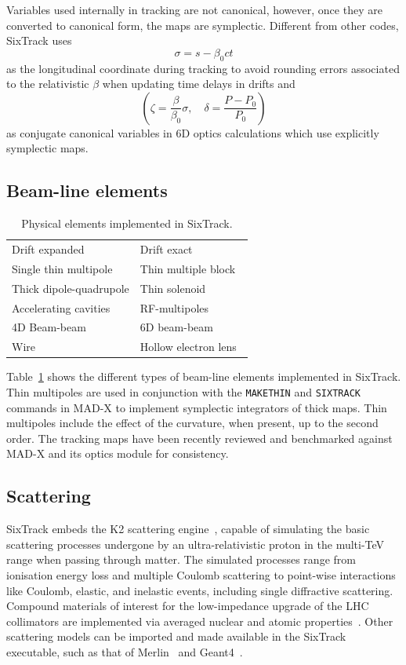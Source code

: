 \documentclass[a4paper,
              ]{jacow}
\begin{document}
Variables used internally in tracking are not canonical, however, once they are converted to canonical form, the maps are symplectic.
Different from other codes, SixTrack uses
\[
\sigma=s - \beta_0 c t
\]
as the longitudinal coordinate during tracking to avoid rounding errors associated to the relativistic $\beta$ when updating time delays in drifts and
\[
\left(\zeta=\frac{\beta}{\beta_0} \sigma, \quad \delta=\frac{P-P_0}{P_0}\right)
\]
as conjugate canonical variables in 6D optics calculations which use explicitly symplectic maps.


\subsection{Beam-line elements}

\begin{table}[ht]
    \centering
    \begin{tabular}{l|l}
        \hline
         Drift expanded & Drift exact~\cite{fjellstrom13} \\
         Single thin multipole &  Thin multiple block \\
         Thick dipole-quadrupole & Thin solenoid \\
         Accelerating cavities &  RF-multipoles~\cite{rf_multipoles}\\
         4D Beam-beam & 6D beam-beam~\cite{beam_beam}\\
         Wire~\cite{wire3} & Hollow electron lens~\cite{elens,elens3}\\
         \hline
    \end{tabular}
    \caption{Physical elements implemented in SixTrack.}
    \label{tab:tracking_elements}
\end{table}

Table~\ref{tab:tracking_elements} shows the different types of beam-line elements implemented in SixTrack. Thin multipoles are used in conjunction with the \texttt{MAKETHIN} and \texttt{SIXTRACK}  commands in MAD-X to implement symplectic integrators of thick maps.
Thin multipoles include the effect of the curvature, when present, up to the second order. The tracking maps have been recently reviewed and benchmarked against MAD-X and its optics module for consistency.

\subsection{Scattering}
SixTrack embeds the K2 scattering engine~\cite{K2,CTambascoThesis}, capable of simulating the basic scattering processes undergone by an ultra-relativistic proton in the multi-TeV range when passing through matter. The simulated processes range from ionisation energy loss and multiple Coulomb scattering to point-wise interactions like Coulomb, elastic, and inelastic events, including single diffractive scattering. Compound materials of interest for the low-impedance upgrade of the LHC collimators are implemented via averaged nuclear and atomic properties~\cite{EQuarantaThesis}. Other scattering models can be imported and made available in the SixTrack executable, such as  that of Merlin~\cite{merlin} and Geant4~\cite{geant4, MolsonIPAC17}.
\end{document}
